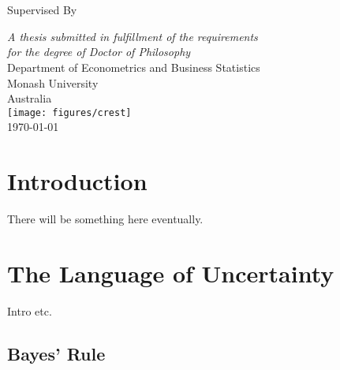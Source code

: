 \documentclass[
12pt, %
onehalfspacing, %
nohyperref, %
headsepline, %
chapterinoneline, %
]{MastersDoctoralThesis} %
\author{Nathaniel Tomasetti}
\begin{document}
\pagestyle{plain}

\begin{titlepage}
\begin{center}

{\huge \bfseries \ttitle\par}\vspace{3mm} %
\HRule \\
\vspace{8mm}

{\huge {\authorname}\\} %
\vspace{8mm}
\large Supervised By {\supname}
 
\vspace{30mm}

\large \textit{A thesis submitted in fulfillment of the requirements\\ for the degree of Doctor of Philosophy}\\
   \vspace{7mm}
  Department of Econometrics and Business Statistics\\
  Monash University\\
  Australia \\
  \vspace{6mm}
   \texttt{[image: figures/crest]} \\
   \vspace{3mm}
  \today
\end{center}
\end{titlepage}

\frontmatter

\tableofcontents

\mainmatter 
\pagestyle{thesis}

\chapter{Introduction}
\label{chap:Intro}

There will be something here eventually.

\chapter{The Language of Uncertainty}
\label{chap:Background}

Intro etc.

\section{Bayes' Rule}
\label{sec:Bayes}
\end{document}
